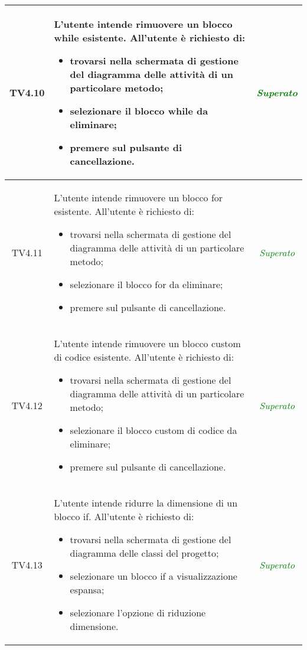 \begin{longtable}{|c|>{}m{8cm}|c|}
\hypertarget{TV4.10}{TV4.10} & L'utente intende rimuovere un blocco while esistente.
All'utente è richiesto di:
\begin{itemize}
	\item trovarsi nella schermata di gestione del diagramma delle attività di un particolare metodo;
	\item selezionare il blocco while da eliminare;
	\item premere sul pulsante di cancellazione.
\end{itemize} & \textcolor{Green}{\textit{Superato}}\\ \hline

\hypertarget{TV4.11}{TV4.11} & L'utente intende rimuovere un blocco for esistente.
All'utente è richiesto di:
\begin{itemize}
	\item trovarsi nella schermata di gestione del diagramma delle attività di un particolare metodo;
	\item selezionare il blocco for da eliminare;
	\item premere sul pulsante di cancellazione.
\end{itemize} & \textcolor{Green}{\textit{Superato}}\\ \hline

\hypertarget{TV4.12}{TV4.12} & L'utente intende rimuovere un blocco custom di codice esistente.
All'utente è richiesto di:
\begin{itemize}
	\item trovarsi nella schermata di gestione del diagramma delle attività di un particolare metodo;
	\item selezionare il blocco custom di codice da eliminare;
	\item premere sul pulsante di cancellazione.
\end{itemize} & \textcolor{Green}{\textit{Superato}}\\ \hline

\hypertarget{TV4.13}{TV4.13} & L'utente intende ridurre la dimensione di un blocco if.
All'utente è richiesto di:
\begin{itemize}
	\item trovarsi nella schermata di gestione del diagramma delle classi del progetto;
	\item selezionare un blocco if a visualizzazione espansa;
	\item selezionare l'opzione di riduzione dimensione.
\end{itemize} & \textcolor{Green}{\textit{Superato}}\\ \hline


\end{longtable}
